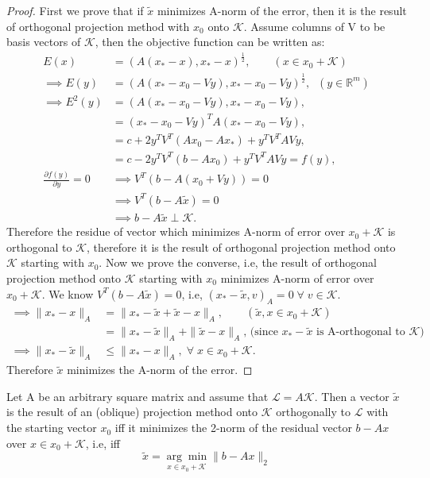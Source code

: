 \documentclass[10pt,a4paper]{article}
\begin{document}
\begin{proof}
First we prove that if $\tilde{x}$ minimizes A-norm of the error, then it is the result of orthogonal projection method with $x_0$ onto $\mathcal{K}$. Assume columns of V to be basis vectors of $\mathcal{K}$, then the objective function can be written as:
\begin{align*}
E(x) &= (A(x_*-x),x_*-x)^{\frac{1}{2}},\qquad(x\in x_0+\mathcal{K}) \\
\implies E(y) &= (A(x_*-x_0-Vy),x_*-x_0-Vy)^{\frac{1}{2}},\;\;(y\in\mathbb{R}^m) \\
\implies E^2(y) &= (A(x_*-x_0-Vy),x_*-x_0-Vy), \\
&= (x_*-x_0-Vy)^TA(x_*-x_0-Vy),\\
&= c + 2y^TV^T(Ax_0-Ax_*) + y^TV^TAVy, \\
&= c - 2y^TV^T(b-Ax_0) + y^TV^TAVy = f(y), \\
\frac{\partial f(y)}{\partial y} = 0 &\implies V^T(b-A(x_0+Vy)) = 0 \\
&\implies V^T(b-A\tilde{x}) = 0 \\
&\implies b-A\tilde{x}\perp \mathcal{K}.
\end{align*}
Therefore the residue of vector which minimizes A-norm of error over $x_0+\mathcal{K}$ is orthogonal to $\mathcal{K}$, therefore it is the result of orthogonal projection method onto $\mathcal{K}$ starting with $x_0$. Now we prove the converse, i.e, the result of orthogonal projection method onto $\mathcal{K}$ starting with $x_0$ minimizes A-norm of error over $x_0+\mathcal{K}$. We know $V^T(b-A\tilde{x}) = 0$, i.e, $(x_*-\tilde{x},v)_A=0\;\forall\;v\in\mathcal{K}$. 
\begin{align*}
\implies \|x_*-x\|_A &= \|x_*-\tilde{x}+\tilde{x}-x\|_A,\qquad(\tilde{x},x\in x_0+\mathcal{K}) \\
&= \|x_*-\tilde{x}\|_A+\|\tilde{x}-x\|_A,\,\text{(since }x_*-\tilde{x}\text{ is A-orthogonal to }\mathcal{K}) \\
\implies \|x_*-\tilde{x}\|_A &\le \|x_*-x\|_A,\;\forall\;x\in x_0+\mathcal{K}.
\end{align*}
Therefore $\tilde{x}$ minimizes the A-norm of the error.
\end{proof}

\begin{corollary}
Let A be an arbitrary square matrix and assume that $\mathcal{L}=A\mathcal{K}.$ Then a vector $\tilde{x}$ is the result of an (oblique) projection method onto $\mathcal{K}$ orthogonally to $\mathcal{L}$ with the starting vector $x_0$ iff it minimizes the 2-norm of the residual vector $b-Ax$ over $x\in x_0+\mathcal{K}$, i.e, iff
$$\tilde{x}=\underset{x\in x_0+\mathcal{K}}{\arg\min}\|b-Ax\|_2$$
\end{corollary}
\end{document}
